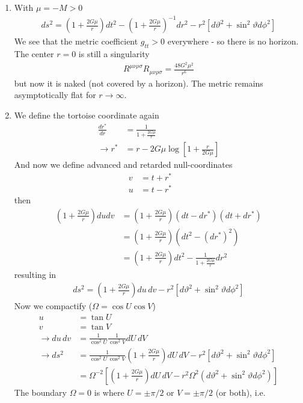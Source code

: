 \documentclass[10pt,a4paper]{article}
\theoremstyle{definition}
\begin{document}
\begin{enumerate}
\item With $\mu=-M>0$
\begin{align}
ds^2 = \left(1 + \frac{2G\mu}{r}\right) dt^2 - \left(1 + \frac{2G\mu}{r}\right)^{-1} dr^2 - r^2[d\vartheta^2+\sin^2\vartheta d\phi^2]
\end{align}
We see that the metric coefficient $g_{tt}>0$ everywhere - so there is no horizon. The center $r=0$ is still a singularity
\begin{align}
R^{\mu\nu\rho\sigma}R_{\mu\nu\rho\sigma}=\frac{48G^2\mu^2}{r^6}
\end{align}
but now it is naked (not covered by a horizon). The metric remains asymptotically flat for $r\rightarrow\infty$.
\item We define the tortoise coordinate again
\begin{align}
\frac{dr^*}{dr}&=\frac{1}{1+\frac{2G\mu}{r}}\\
\rightarrow r^*&=r-2G\mu\log\left[1+\frac{r}{2G\mu}\right]
\end{align}
And now we define advanced and retarded null-coordinates
\begin{align}
v&=t+r^*\qquad\\
u&=t-r^*\qquad
\end{align}
then
\begin{align}
\left(1+\frac{2G\mu}{r}\right)du dv 
&= \left(1+\frac{2G\mu}{r}\right)(dt-dr^*)(dt+dr^*)\\
&= \left(1+\frac{2G\mu}{r}\right)(dt^2-(dr^*)^2)\\
&=\left(1+\frac{2G\mu}{r}\right)dt^2-\frac{1}{1+\frac{2G\mu}{r}}dr^2
\end{align}
resulting in
\begin{align}
ds^2 = \left(1 + \frac{2G\mu}{r}\right) du\,dv - r^2[d\vartheta^2+\sin^2\vartheta d\phi^2]
\end{align}
Now we compactify ($\Omega=\cos U\cos V$)
\begin{align}
u&=\tan U\\
v&=\tan V\\
\rightarrow du\,dv&=\frac{1}{\cos^2U}\frac{1}{\cos^2V} dU\,dV\\
\rightarrow ds^2 &= \frac{1}{\cos^2U\,\cos^2V}\left(1 + \frac{2G\mu}{r}\right) dU\,dV - r^2[d\vartheta^2+\sin^2\vartheta d\phi^2]\\
&=\Omega^{-2}\left[\left(1 + \frac{2G\mu}{r}\right)dU\,dV - r^2\Omega^2(d\vartheta^2+\sin^2\vartheta d\phi^2)\right]
\end{align}
The boundary $\Omega=0$ is where $U=\pm\pi/2$ or $V=\pm\pi/2$ (or both), i.e.

\end{enumerate}
\end{document}
